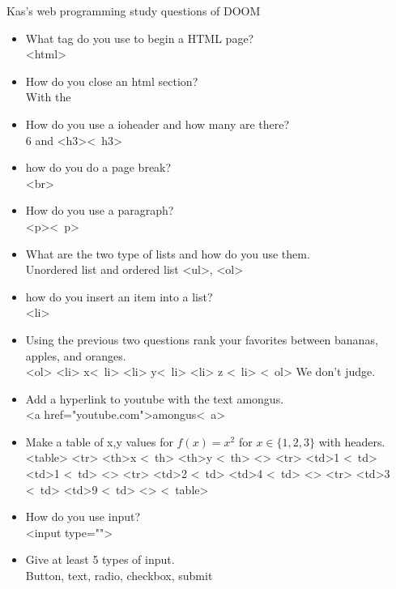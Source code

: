 \documentclass{article}
\begin{document}
\begin{center}
    Kas's web programming study questions of DOOM
\end{center}
\begin{itemize}
    \item What tag do you use to begin a HTML page?\\
    <html>\\
    \item How do you close an html section?\\
    With the \ \\
    \item How do you use a ioheader and how many are there?\\
    6 and <h3><\ h3>\\
    \item how do you do a page break?\\
    <br>\\
    \item How do you use a paragraph?\\
    <p><\ p>\\
    \item What are the two type of lists and how do you use them.\\
    Unordered list and ordered list <ul>, <ol>\\
    \item how do you insert an item into a list?\\
    <li>\\
    \item Using the previous two questions rank your favorites between bananas, apples, and oranges.\\
    <ol>
    <li> x<\ li>
    <li> y<\ li>
    <li> z <\ li>
    <\ ol>
    We don't judge.

    \item Add a hyperlink to youtube with the text amongus.\\
    <a href="youtube.com">amongus<\ a>
    

    \item Make a table of x,y values for $f(x) = x^{2}$ for $x \in \{1, 2, 3\}$ with headers.\\
    <table>
    <tr> 
        <th>x <\ th>
        <th>y <\ th>
    <\tr>
    <tr> 
        <td>1 <\ td>
        <td>1 <\ td>
    <\tr>
    <tr> 
        <td>2 <\ td>
        <td>4 <\ td>
    <\tr>
    <tr> 
        <td>3 <\ td>
        <td>9 <\ td>
    <\tr>
    <\ table>

    \item How do you use input?\\
    <input type="">\\
    \item Give at least 5 types of input.\\
    Button, text, radio, checkbox, submit\\


\end{itemize}
\end{document}
